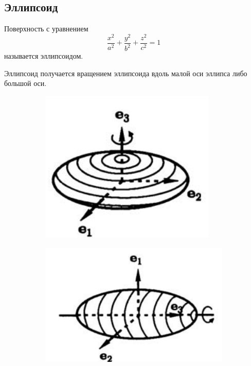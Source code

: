 \subsection*{Эллипсоид}
Поверхность с уравнением $$
  \frac{x^2}{a^2} + \frac{y^2}{b^2} + \frac{z^2}{c^2} = 1
$$ называется эллипсоидом.

Эллипсоид получается вращением эллипсоида вдоль малой оси эллипса либо большой оси.
\begin{figure}[H]
  \centering
  \begin{subfigure}[b]{0.4\textwidth}
    \centering
    \includegraphics[width = \textwidth]{images/second_ellipsoid_A.png}
  \end{subfigure}
  \hfill
  \begin{subfigure}[b]{0.4\textwidth}
    \centering
    \includegraphics[width = \textwidth]{images/second_ellipsoid_B.png}
  \end{subfigure}
\end{figure}

